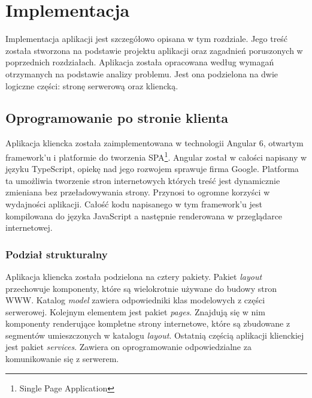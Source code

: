 \documentclass[12pt, twoside]{report}
\begin{document}
\chapter{Implementacja}
Implementacja aplikacji jest szczegółowo opisana w tym rozdziale. Jego treść została stworzona na podstawie projektu aplikacji oraz zagadnień poruszonych w poprzednich rozdziałach. Aplikacja została opracowana według wymagań otrzymanych na podstawie analizy problemu. Jest ona podzielona na dwie logiczne części: stronę serwerową oraz kliencką. 

\section{Oprogramowanie po stronie klienta}
Aplikacja kliencka została zaimplementowana w technologii Angular 6, otwartym framework'u i platformie do tworzenia SPA\footnote{Single Page Application}. Angular został w całości napisany w języku TypeScript, opiekę nad jego rozwojem sprawuje firma Google. Platforma ta umożliwia tworzenie stron internetowych których treść jest dynamicznie zmieniana bez przeładowywania strony. Przynosi to ogromne korzyści w wydajności aplikacji. Całość kodu napisanego w tym framework'u jest kompilowana do języka JavaScript a następnie renderowana w przeglądarce internetowej. 
\subsection{Podział strukturalny}
Aplikacja kliencka została podzielona na cztery pakiety. Pakiet \textit{layout} przechowuje komponenty, które są wielokrotnie używane do budowy stron WWW. Katalog \textit{model} zawiera odpowiedniki klas modelowych z części serwerowej. Kolejnym elementem jest pakiet \textit{pages}. Znajdują się w nim komponenty renderujące kompletne strony internetowe, które są zbudowane z segmentów umieszczonych w katalogu \textit{layout}. Ostatnią częścią aplikacji klienckiej jest pakiet \textit{services}. Zawiera on oprogramowanie odpowiedzialne za komunikowanie się z serwerem. 
\end{document}
